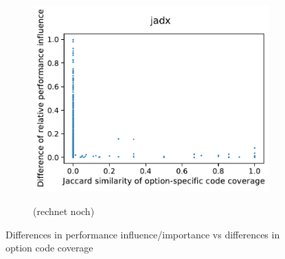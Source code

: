 \begin{figure}
\begin{subfigure}{0.33\textwidth}
		\includegraphics[width=\linewidth]{images/rq3.2/jadx_rq3.2.pdf}
		\caption{\jadx}
	\end{subfigure}
	\begin{subfigure}{0.33\textwidth}
		\centering
		(rechnet noch)
		\caption{\kanzi}
	\end{subfigure}
	\caption{Differences in performance influence/importance vs differences in option code coverage}
	\label{fig:diff_performance_option_coverage}
\end{figure}



